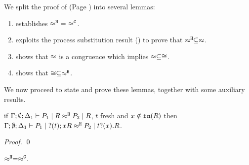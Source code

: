 \noi We split the proof of  (Page \pageref{the:coincidence}) into 
several lemmas:
\begin{enumerate}[$-$]
\item	{} establishes $\hwb\ =\ \fwb$.
\item	{} exploits the process substitution result
		() to prove that $\approx^\mathtt{H} \subseteq \approx$.
\item	{} shows that $\approx$ is a congruence
		which implies $\approx \subseteq \cong$.
\item	{} shows  that $\cong \subseteq \approx^\mathtt{H}$.
\end{enumerate}


\noi
We now proceed to state and prove these lemmas, together with some auxiliary results.

\begin{lemma}
	\label{app:lem_fresh_name}
	if $\Gamma; \emptyset; \Delta_1 \vdash P_1 \;|\; R \approx^\mathtt{H} P_2 \;|\; R$, $t$
	fresh and $x \notin \mathtt{fn}(R)$ then
	$\Gamma; \emptyset; \Delta_1 \vdash P_1 \;|\; ? (t) ;{x} R \approx^\mathtt{H} P_2 \;|\; t ? (x) . R$.
\end{lemma}

\begin{proof}
	\qed
\end{proof}




\begin{lemma}
	\label{app:lem:wb_eq_wbf}
	$\approx^\mathtt{H} = \approx^\mathtt{C}$.
\end{lemma}

